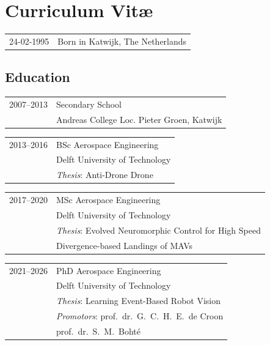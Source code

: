 \chapter*{Curriculum Vit\ae}

\makeatletter
\authors{\@firstname\ {\titleshape\@lastname}}
\makeatother

\noindent
\begin{longtable}{p{} p{}}
    24-02-1995 & Born in Katwijk, The Netherlands
\end{longtable}

\section*{Education}
\vspace{-10pt}
\noindent
\begin{longtable}{p{} p{}}
	2007--2013 & Secondary School\\
	& Andreas College Loc. Pieter Groen, Katwijk
\end{longtable}
\vspace{-14pt}
\begin{longtable}{p{} p{}}
	2013--2016 & BSc Aerospace Engineering\\
	& Delft University of Technology \\
	& \textit{Thesis}:\hspace{25pt} Anti-Drone Drone
\end{longtable}
\vspace{-14pt}
\begin{longtable}{p{} p{}}
	2017--2020 & MSc Aerospace Engineering\\
	& Delft University of Technology \\
	& \textit{Thesis}:\hspace{25pt} Evolved Neuromorphic Control for High Speed\\
	&\hspace{55pt}Divergence-based Landings of MAVs
\end{longtable}
\vspace{-14pt}
\begin{longtable}{p{} p{}}
	2021--2026 & PhD Aerospace Engineering\\
	& Delft University of Technology \\
	& \textit{Thesis}:\hspace{25pt} Learning Event-Based Robot Vision \\
	& \textit{Promotors}:\hspace{10pt} prof.\ dr.\ G.\ C.\ H.\ E.\ de Croon\\
	&\hspace{55pt}prof.\ dr.\ S.\ M.\ Boht\'e
\end{longtable}

